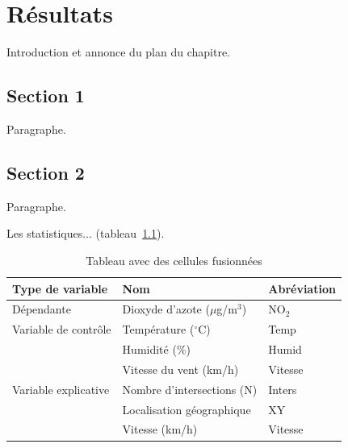 \chapter{Résultats} \label{chap:resultats}

Introduction et annonce du plan du chapitre.
\lipsum[1] %

\section{Section 1} \label{sec:titre_section1}

Paragraphe.
\lipsum[1] %


\section{Section 2} \label{sec:titre_section2}

Paragraphe.
\lipsum[1-2] %

Les statistiques... (tableau~\ref{tab:cellules_fusionnees}).

\begin{table}[H]
    \singlespacing
    \begin{threeparttable}
    \caption{Tableau avec des cellules fusionnées}
    \label{tab:cellules_fusionnees}
    \renewcommand{\arraystretch}{1.2}
    \begin{tabular}{lll}
        \hline
        \textbf{Type de variable} & \textbf{Nom} & \textbf{Abréviation} \\
        \hline
        Dépendante & Dioxyde d'azote ($\mu$g/m$^3$) & NO$_2$ \\
        \hline
        Variable de contrôle & Température ($^\circ$C) & Temp \\
                             & Humidité (\%) & Humid \\
                             & Vitesse du vent (km/h) & Vitesse \\
        \hline
        Variable explicative & Nombre d'intersections (N) & Inters \\
                             & Localisation géographique & XY \\
                             & Vitesse (km/h) & Vitesse \\
        \hline
    \end{tabular}
    \end{threeparttable}
\end{table}

